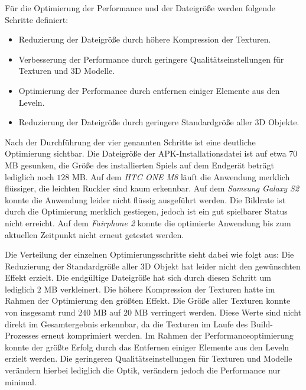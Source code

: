 	Für die Optimierung der Performance und der Dateigröße werden folgende Schritte definiert:
	\begin{itemize}
	\item{ Reduzierung der Dateigröße durch höhere Kompression der Texturen.}
	\item{ Verbesserung der Performance durch geringere Qualitätseinstellungen für Texturen und 3D Modelle.}
	\item{ Optimierung der Performance durch entfernen einiger Elemente aus den Leveln.}
	\item{ Reduzierung der Dateigröße durch geringere Standardgröße aller 3D Objekte.}
	\end{itemize}

	Nach der Durchführung der vier genannten Schritte ist eine deutliche Optimierung sichtbar. Die Dateigröße der APK-Installationsdatei ist auf etwa $70$ MB gesunken, die Größe des installierten Spiels auf dem Endgerät beträgt lediglich noch $128$ MB.
	Auf dem \emph{HTC ONE M8} läuft die Anwendung merklich flüssiger, die leichten Ruckler sind kaum erkennbar. Auf dem \emph{Samsung Galaxy S2} konnte die Anwendung leider nicht flüssig ausgeführt werden. Die Bildrate ist durch die Optimierung merklich gestiegen, jedoch ist ein gut spielbarer Status nicht erreicht. Auf dem \emph{Fairphone 2} konnte die optimierte Anwendung bis zum aktuellen Zeitpunkt nicht erneut getestet werden.

	Die Verteilung der einzelnen Optimierungsschritte sieht dabei wie folgt aus:
	Die Reduzierung der Standardgröße aller 3D Objekt hat leider nicht den gewünschten Effekt erzielt. Die endgültige Dateigröße hat sich durch diesen Schritt um lediglich $2$ MB verkleinert. Die höhere Kompression der Texturen hatte im Rahmen der Optimierung den größten Effekt. Die Größe aller Texturen konnte von insgesamt rund $240$ MB auf $20$ MB verringert werden. Diese Werte sind nicht direkt im Gesamtergebnis erkennbar, da die Texturen im Laufe des Build-Prozesses erneut komprimiert werden.
	Im Rahmen der Performanceoptimierung konnte der größte Erfolg durch das Entfernen einiger Elemente aus den Leveln erzielt werden. Die geringeren Qualitätseinstellungen für Texturen und Modelle verändern hierbei lediglich die Optik, verändern jedoch die Performance nur minimal.

